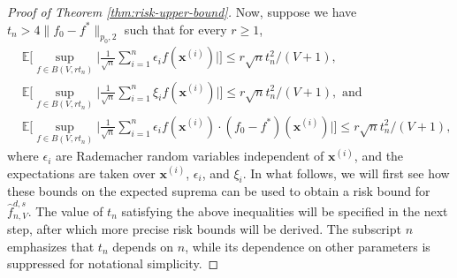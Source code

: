\documentclass[10pt]{article}
\newcommand{\E}{{\mathbb E}}
\newcommand{\lsefstinf}{{\hat{f}^{d, s}_{n, V}}}
\newcommand{\xbf}{{\mathbf{x}}}
\begin{document}
\begin{proof}[Proof of Theorem \ref{thm:risk-upper-bound}]
Now, suppose we have $t_n > 4 \|f_0 - f^*\|_{p_0, 2}$ such that for every $r \ge 1$,  
\begin{equation}\label{eq:expected-suprema-bound}
\begin{aligned}
    &\E\Big[ \sup_{f \in B(V, rt_n)} \Big| \frac{1}{\sqrt{n}} 
    \sum_{i = 1}^{n} \epsilon_i f(\xbf^{(i)})\Big|\Big] 
    \le r\sqrt{n}t_n^2 / (V + 1), \\
    &\E\Big[ \sup_{f \in B(V, rt_n)} \Big| \frac{1}{\sqrt{n}} 
    \sum_{i = 1}^{n} \xi_i f(\xbf^{(i)})\Big|\Big] 
    \le r\sqrt{n}t_n^2 / (V + 1), \text{ and } \\
    &\E\Big[ \sup_{f \in B(V, rt_n)} \Big| \frac{1}{\sqrt{n}} 
    \sum_{i = 1}^{n} \epsilon_i f(\xbf^{(i)})\cdot 
    (f_0 - f^*)(\xbf^{(i)})\Big|\Big] 
    \le r\sqrt{n}t_n^2 / (V + 1),
\end{aligned}
\end{equation}
where $\epsilon_i$ are Rademacher random variables 
independent of $\xbf^{(i)}$, and the expectations are taken over 
$\xbf^{(i)}$, $\epsilon_i$, and $\xi_i$.
In what follows, we will first see how these bounds on the expected suprema can 
be used to obtain a risk bound for $\lsefstinf$. The value of $t_n$ satisfying the 
above inequalities will be specified in the next step, after which 
more precise risk bounds will be derived. The subscript $n$ 
emphasizes that $t_n$ depends on $n$, while its dependence on other parameters 
is suppressed for notational simplicity.
    

\end{proof}
\end{document}
